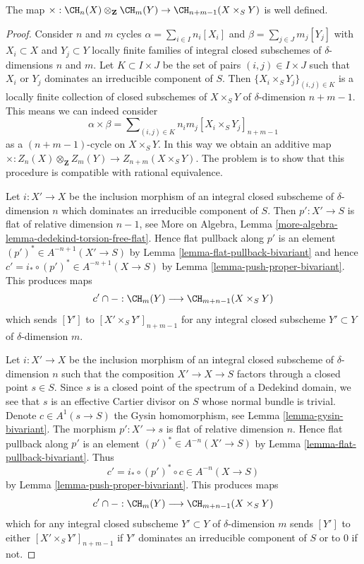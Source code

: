 \begin{lemma}
\label{lemma-exterior-product-well-defined-dim-1}
The map $\times : \CH_n(X) \otimes_{\mathbf{Z}} \CH_m(Y) \to
\CH_{n + m - 1}(X \times_S Y)$ is well defined.
\end{lemma}

\begin{proof}
Consider $n$ and $m$ cycles $\alpha = \sum_{i \in I} n_i[X_i]$
and $\beta = \sum_{j \in J} m_j[Y_j]$ with $X_i \subset X$ and $Y_j \subset Y$
locally finite families of integral closed subschemes of
$\delta$-dimensions $n$ and $m$. Let $K \subset I \times J$ be the set
of pairs $(i, j) \in I \times J$ such that $X_i$ or $Y_j$ dominates
an irreducible component of $S$.
Then $\{X_i \times_S Y_j\}_{(i, j) \in K}$ is a locally finite
collection of closed subschemes of $X \times_S Y$ of
$\delta$-dimension $n + m - 1$. This means we can indeed consider
$$
\alpha \times \beta =
\sum\nolimits_{(i, j) \in K} n_i m_j [X_i \times_S Y_j]_{n + m - 1}
$$
as a $(n + m - 1)$-cycle on $X \times_S Y$. In this way we obtain an
additive map
$\times : Z_n(X) \otimes_{\mathbf{Z}} Z_m(Y) \to Z_{n + m}(X \times_S Y)$.
The problem is to show that
this procedure is compatible with rational equivalence.

\medskip\noindent
Let $i : X' \to X$ be the inclusion morphism of an integral closed subscheme
of $\delta$-dimension $n$ which dominates an irreducible component
of $S$. Then $p' : X' \to S$ is flat of relative dimension $n - 1$, see
More on Algebra, Lemma \ref{more-algebra-lemma-dedekind-torsion-free-flat}.
Hence flat pullback along $p'$ is an element
$(p')^* \in A^{-n + 1}(X' \to S)$ by
Lemma \ref{lemma-flat-pullback-bivariant}
and hence $c' = i_* \circ (p')^* \in A^{-n + 1}(X \to S)$ by
Lemma \ref{lemma-push-proper-bivariant}.
This produces maps
$$
c' \cap - : \CH_m(Y) \longrightarrow \CH_{m + n - 1}(X \times_S Y)
$$
which sends $[Y']$ to $[X' \times_S Y']_{n + m - 1}$ for any
integral closed subscheme $Y' \subset Y$ of $\delta$-dimension $m$.

\medskip\noindent
Let $i : X' \to X$ be the inclusion morphism of an integral closed subscheme
of $\delta$-dimension $n$ such that the composition $X' \to X \to S$ 
factors through a closed point $s \in S$. Since $s$ is a closed point
of the spectrum of a Dedekind domain, we see that $s$ is an effective
Cartier divisor on $S$ whose normal bundle is trivial. Denote
$c \in A^1(s \to S)$ the Gysin homomorphism, see
Lemma \ref{lemma-gysin-bivariant}. The morphism $p' : X' \to s$
is flat of relative dimension $n$. Hence flat pullback along $p'$
is an element $(p')^* \in A^{-n}(X' \to S)$ by
Lemma \ref{lemma-flat-pullback-bivariant}.
Thus
$$
c' = i_* \circ (p')^* \circ c \in A^{-n}(X \to S)
$$
by Lemma \ref{lemma-push-proper-bivariant}. This produces maps
$$
c' \cap - : \CH_m(Y) \longrightarrow \CH_{m + n - 1}(X \times_S Y)
$$
which for any integral closed subscheme $Y' \subset Y$
of $\delta$-dimension $m$
sends $[Y']$ to either $[X' \times_S Y']_{n + m - 1}$ if $Y'$ dominates
an irreducible component of $S$ or to $0$ if not.


\end{proof}
